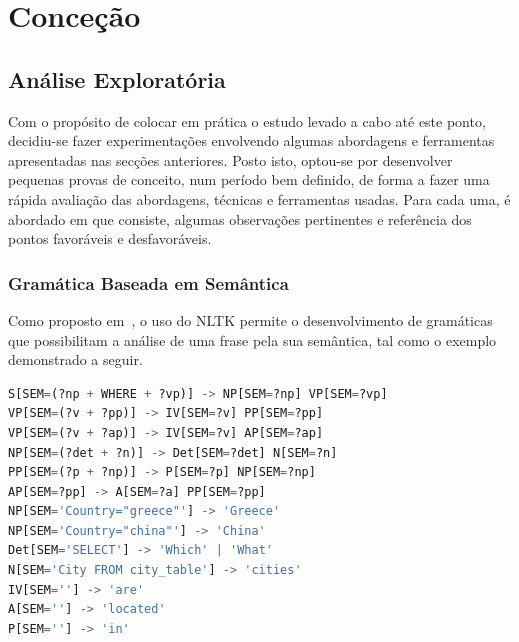 \chapter{Conceção}
\label{chap:Chapter4}
\tbd

\section{Análise Exploratória}
\label{sec:chap03_approaches}
Com o propósito de colocar em prática o estudo levado a cabo até este ponto, decidiu-se fazer experimentações envolvendo algumas abordagens e ferramentas apresentadas nas secções anteriores. Posto isto, optou-se por desenvolver pequenas provas de conceito, num período bem definido, de forma a fazer uma rápida avaliação das abordagens, técnicas e ferramentas usadas. Para cada uma, é abordado em que consiste, algumas observações pertinentes e referência dos pontos favoráveis e desfavoráveis.

\subsection{Gramática Baseada em Semântica}
Como proposto em~\textcite[p.~361-403]{natural_language_processing_with_python}, o uso do NLTK permite o desenvolvimento de gramáticas que possibilitam a análise de uma frase pela sua semântica, tal como o exemplo demonstrado a seguir.

\begin{lstlisting}[language=Python,caption={Excerto de uma gramática extraída de~\textcite{natural_language_processing_with_python}},numbers=none,label=lst:grammarexample,basicstyle=\scriptsize]
S[SEM=(?np + WHERE + ?vp)] -> NP[SEM=?np] VP[SEM=?vp]
VP[SEM=(?v + ?pp)] -> IV[SEM=?v] PP[SEM=?pp]
VP[SEM=(?v + ?ap)] -> IV[SEM=?v] AP[SEM=?ap]
NP[SEM=(?det + ?n)] -> Det[SEM=?det] N[SEM=?n]
PP[SEM=(?p + ?np)] -> P[SEM=?p] NP[SEM=?np]
AP[SEM=?pp] -> A[SEM=?a] PP[SEM=?pp]
NP[SEM='Country="greece"'] -> 'Greece'
NP[SEM='Country="china"'] -> 'China'
Det[SEM='SELECT'] -> 'Which' | 'What'
N[SEM='City FROM city_table'] -> 'cities'
IV[SEM=''] -> 'are'
A[SEM=''] -> 'located'
P[SEM=''] -> 'in'
\end{lstlisting}

